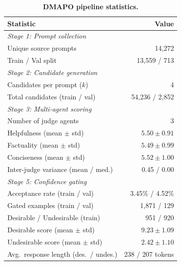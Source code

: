 \documentclass[10pt,twocolumn]{article}
\newcommand{\ours}{\textsc{DMAPO}}
\begin{document}
\begin{table}[t]
\centering
\caption{\textbf{\ours{} pipeline statistics.}}
\label{tab:pipeline_stats}
\vspace{0.5em}
\begin{tabular}{l r}
\toprule
\textbf{Statistic} & \textbf{Value} \\
\midrule
\multicolumn{2}{l}{\textit{Stage 1: Prompt collection}} \\
\quad Unique source prompts       & 14{,}272 \\
\quad Train / Val split           & 13{,}559 / 713 \\
\midrule
\multicolumn{2}{l}{\textit{Stage 2: Candidate generation}} \\
\quad Candidates per prompt ($k$) & 4 \\
\quad Total candidates (train / val) & 54{,}236 / 2{,}852 \\
\midrule
\multicolumn{2}{l}{\textit{Stage 3: Multi-agent scoring}} \\
\quad Number of judge agents      & 3 \\
\quad Helpfulness (mean $\pm$ std)  & $5.50 \pm 0.91$ \\
\quad Factuality (mean $\pm$ std)   & $5.49 \pm 0.99$ \\
\quad Conciseness (mean $\pm$ std)  & $5.52 \pm 1.00$ \\
\quad Inter-judge variance (mean / med.) & 0.45 / 0.00 \\
\midrule
\multicolumn{2}{l}{\textit{Stage 5: Confidence gating}} \\
\quad Acceptance rate (train / val) & 3.45\% / 4.52\% \\
\quad Gated examples (train / val)  & 1{,}871 / 129 \\
\quad \quad Desirable / Undesirable (train) & 951 / 920 \\
\quad Desirable score (mean $\pm$ std) & $9.23 \pm 1.09$ \\
\quad Undesirable score (mean $\pm$ std) & $2.42 \pm 1.10$ \\
\quad Avg.\ response length (des.\ / undes.) & 238 / 207 tokens \\
\bottomrule
\end{tabular}
\end{table}


\end{document}
